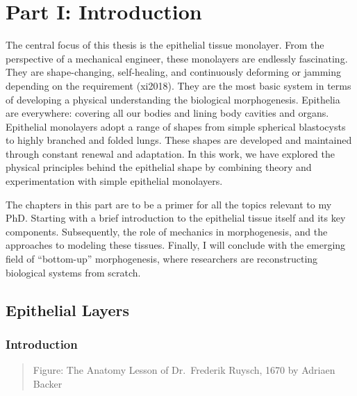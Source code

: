 \documentclass[
]{article}
\begin{document}
\hypertarget{part-i-introduction-1}{%
\section{Part I: Introduction}\label{part-i-introduction-1}}

The central focus of this thesis is the epithelial tissue monolayer.
From the perspective of a mechanical engineer, these monolayers are
endlessly fascinating. They are shape-changing, self-healing, and
continuously deforming or jamming depending on the requirement (xi2018).
They are the most basic system in terms of developing a physical
understanding the biological morphogenesis. Epithelia are everywhere:
covering all our bodies and lining body cavities and organs. Epithelial
monolayers adopt a range of shapes from simple spherical blastocysts to
highly branched and folded lungs. These shapes are developed and
maintained through constant renewal and adaptation. In this work, we
have explored the physical principles behind the epithelial shape by
combining theory and experimentation with simple epithelial monolayers.

The chapters in this part are to be a primer for all the topics relevant
to my PhD. Starting with a brief introduction to the epithelial tissue
itself and its key components. Subsequently, the role of mechanics in
morphogenesis, and the approaches to modeling these tissues. Finally, I
will conclude with the emerging field of ``bottom-up'' morphogenesis,
where researchers are reconstructing biological systems from scratch.

\hypertarget{epithelial-layers-1}{%
\subsection{Epithelial Layers}\label{epithelial-layers-1}}

\hypertarget{introduction}{%
\subsubsection{Introduction}\label{introduction}}

\begin{quote}
Figure: The Anatomy Lesson of Dr.~Frederik Ruysch, 1670 by Adriaen
Backer
\end{quote}
\end{document}
